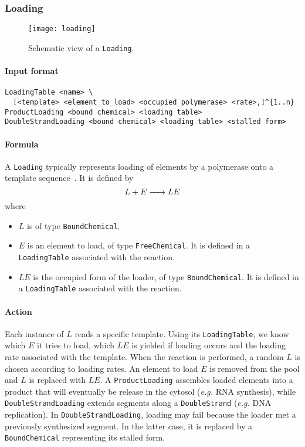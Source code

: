 \subsubsection{Loading}

\begin{figure}[!h]
  \centering
  \texttt{[image: loading]}
  \caption{Schematic view of a \texttt{Loading}.}
\label{fig:loading}
\end{figure}

\paragraph{Input format}
\begin{verbatim}
LoadingTable <name> \
  [<template> <element_to_load> <occupied_polymerase> <rate>,]^{1..n}
ProductLoading <bound chemical> <loading table>
DoubleStrandLoading <bound chemical> <loading table> <stalled form>
\end{verbatim}

\paragraph{Formula}
A \texttt{Loading} typically represents loading of elements by a polymerase
onto a template sequence~\reffigp{fig:loading}.
It is defined by
\[
\reactionIrr{L + E}{LE}{}{}
\]
where
\begin{itemize}
	\item $L$ is of type \texttt{BoundChemical}.
	\item $E$ is an element to load, of type \texttt{FreeChemical}.
  It is defined in a \texttt{LoadingTable} associated with the reaction.
	\item $LE$ is the occupied form of the loader, of type \texttt{BoundChemical}.
  It is defined in a \texttt{LoadingTable} associated with the reaction.
\end{itemize}

\paragraph{Action}
Each instance of $L$ reads a specific template.
Using its \texttt{LoadingTable}, we know which $E$ it tries to load,
which $LE$ is yielded if loading occurs and the loading rate associated with the template.
When the reaction is performed, a random $L$ is chosen according to loading rates.
An element to load $E$ is removed from the pool and $L$ is replaced with $LE$.
A \texttt{ProductLoading} assembles loaded elements into a product
that will eventually be release in the cytosol (\textit{e.g.} RNA synthesis),
while \texttt{DoubleStrandLoading} extends segments along a \texttt{DoubleStrand}
(\textit{e.g.} DNA replication).
In \texttt{DoubleStrandLoading},
loading may fail because the loader met a previously synthesized segment.
In the latter case,
it is replaced by a \texttt{BoundChemical} representing its stalled form.

